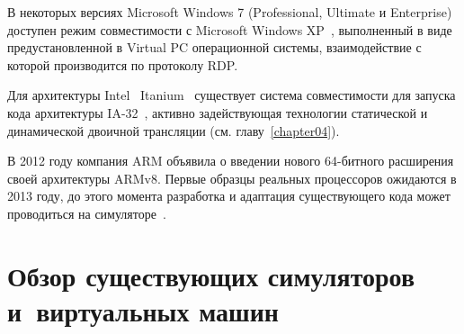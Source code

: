 \begin{itemize*}
\item В некоторых версиях Microsoft Windows 7 (Professional, Ultimate и Enterprise) доступен режим совместимости с Microsoft Windows XP~\cite{winxp-mode}, выполненный в виде предустановленной в Virtual PC операционной системы, взаимодействие с которой производится по протоколу RDP.

\item Для архитектуры Intel\textregistered~ Itanium\texttrademark~ существует система совместимости для запуска кода архитектуры IA-32~\cite{Baraz03ia-32execution}, активно задействующая технологии статической и динамической двоичной трансляции (см. главу~\ref{chapter04}).

\item В 2012 году компания ARM объявила о введении нового 64-битного расширения своей архитектуры ARMv8. Первые образцы реальных процессоров ожидаются в 2013 году, до этого момента разработка и адаптация существующего кода может проводиться на симуляторе~\cite{armv8}.
\end{itemize*}

\section{Обзор существующих симуляторов и~виртуальных машин}\label{sec:implementations}

